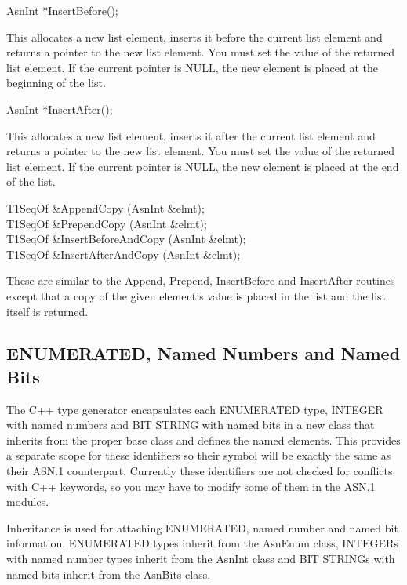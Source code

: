 \begin{Ccode}
AsnInt \>\>\>*InsertBefore();
\end{Ccode}
This allocates a new list element, inserts it before the current list
element and returns a pointer to the new list element.  You must set
the value of the returned list element.  If the current pointer is
{\C NULL}, the new element is placed at the beginning of the list.

\begin{Ccode}
AsnInt \>\>\>*InsertAfter();
\end{Ccode}
This allocates a new list element, inserts it after the current list
element and returns a pointer to the new list element.  You must set
the value of the returned list element.  If the current pointer is
{\C NULL}, the new element is placed at the end of the list.

\begin{Ccode}
T1SeqOf \>\>\>\&AppendCopy (AsnInt \&elmt);\\
T1SeqOf \>\>\>\&PrependCopy (AsnInt \&elmt);\\
T1SeqOf \>\>\>\&InsertBeforeAndCopy (AsnInt \&elmt);\\
T1SeqOf \>\>\>\&InsertAfterAndCopy (AsnInt \&elmt);
\end{Ccode}
These are similar to the {\C Append}, {\C Prepend},
{\C InsertBefore} and {\C InsertAfter} routines except that a
copy of the given element's value is placed in the list and the list
itself is returned.

\subsection{\label{C++-enumerated-section}ENUMERATED, Named Numbers and Named Bits}

The C++ type generator encapsulates each ENUMERATED type, INTEGER
with named numbers and BIT STRING with named bits in a new class that
inherits from the proper base class and defines the named elements.
This provides a separate scope for these identifiers so their symbol
will be exactly the same as their ASN.1 counterpart.  Currently these
identifiers are not checked for conflicts with C++ keywords, so you
may have to modify some of them in the ASN.1 modules.

Inheritance is used for attaching ENUMERATED, named number and named
bit information.  ENUMERATED types inherit from the {\C AsnEnum} class,
INTEGERs with named number types inherit from the {\C AsnInt} class and BIT
STRINGs with named bits inherit from the {\C AsnBits} class.


